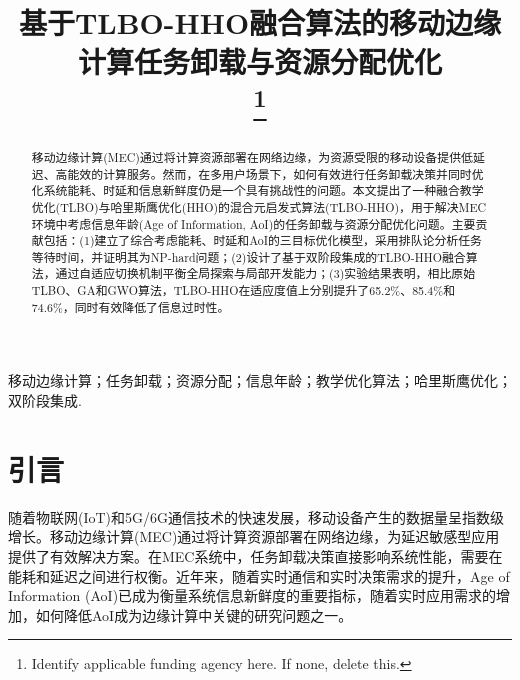 \documentclass[conference]{IEEEtran}
\begin{document}
\title{基于TLBO-HHO融合算法的移动边缘计算任务卸载与资源分配优化\\
\thanks{Identify applicable funding agency here. If none, delete this.}
}

\author{
\and
{}
\and
{}
}

\maketitle

\begin{abstract}
移动边缘计算(MEC)通过将计算资源部署在网络边缘，为资源受限的移动设备提供低延迟、高能效的计算服务。然而，在多用户场景下，如何有效进行任务卸载决策并同时优化系统能耗、时延和信息新鲜度仍是一个具有挑战性的问题。本文提出了一种融合教学优化(TLBO)与哈里斯鹰优化(HHO)的混合元启发式算法(TLBO-HHO)，用于解决MEC环境中考虑信息年龄(Age of Information, AoI)的任务卸载与资源分配优化问题。主要贡献包括：(1)建立了综合考虑能耗、时延和AoI的三目标优化模型，采用排队论分析任务等待时间，并证明其为NP-hard问题；(2)设计了基于双阶段集成的TLBO-HHO融合算法，通过自适应切换机制平衡全局探索与局部开发能力；(3)实验结果表明，相比原始TLBO、GA和GWO算法，TLBO-HHO在适应度值上分别提升了65.2\%、85.4\%和74.6\%，同时有效降低了信息过时性。
\end{abstract}

\begin{IEEEkeywords}
移动边缘计算；任务卸载；资源分配；信息年龄；教学优化算法；哈里斯鹰优化；双阶段集成.
\end{IEEEkeywords}

\section{引言}
随着物联网(IoT)和5G/6G通信技术的快速发展，移动设备产生的数据量呈指数级增长。移动边缘计算(MEC)通过将计算资源部署在网络边缘，为延迟敏感型应用提供了有效解决方案\cite{b1}。在MEC系统中，任务卸载决策直接影响系统性能，需要在能耗和延迟之间进行权衡。近年来，随着实时通信和实时决策需求的提升，Age of Information (AoI)已成为衡量系统信息新鲜度的重要指标\cite{b18}，随着实时应用需求的增加，如何降低AoI成为边缘计算中关键的研究问题之一。
\end{document}
